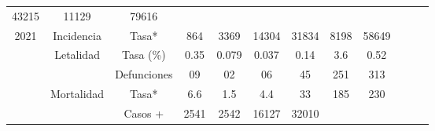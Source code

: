 \begin{tabular}{ccc|cccccc|lll}
		\multicolumn{1}{c|}{\cellcolor[HTML]{FFFC9E}43215} &
		\multicolumn{1}{c|}{\cellcolor[HTML]{FFFC9E}11129} &
		\cellcolor[HTML]{FFFC9E}79616 &
		&
		&
		\\ \cline{2-9}
		\multicolumn{1}{|c|}{\multirow{-5}{*}{\cellcolor[HTML]{FFFC9E}2021}} &
		\multicolumn{1}{c|}{\cellcolor[HTML]{FFFC9E}Incidencia} &
		\cellcolor[HTML]{FFFC9E}Tasa* &
		\multicolumn{1}{c|}{\cellcolor[HTML]{FFFC9E}864} &
		\multicolumn{1}{c|}{\cellcolor[HTML]{FFFC9E}3369} &
		\multicolumn{1}{c|}{\cellcolor[HTML]{FFFC9E}14304} &
		\multicolumn{1}{c|}{\cellcolor[HTML]{FFFC9E}31834} &
		\multicolumn{1}{c|}{\cellcolor[HTML]{FFFC9E}8198} &
		\cellcolor[HTML]{FFFC9E}58649 &
		&
		&
		\\ \cline{1-9}
		\multicolumn{1}{|c|}{\cellcolor[HTML]{C1EFC0}} &
		\multicolumn{1}{c|}{\cellcolor[HTML]{C1EFC0}Letalidad} &
		\cellcolor[HTML]{C1EFC0}Tasa (\%) &
		\multicolumn{1}{c|}{\cellcolor[HTML]{C1EFC0}0.35} &
		\multicolumn{1}{c|}{\cellcolor[HTML]{C1EFC0}0.079} &
		\multicolumn{1}{c|}{\cellcolor[HTML]{C1EFC0}0.037} &
		\multicolumn{1}{c|}{\cellcolor[HTML]{C1EFC0}0.14} &
		\multicolumn{1}{c|}{\cellcolor[HTML]{C1EFC0}3.6} &
		\cellcolor[HTML]{C1EFC0}0.52 &
		&
		&
		\\ \cline{3-9}
		\multicolumn{1}{|c|}{\cellcolor[HTML]{C1EFC0}} &
		\multicolumn{1}{c|}{\cellcolor[HTML]{C1EFC0}} &
		\cellcolor[HTML]{C1EFC0}Defunciones &
		\multicolumn{1}{c|}{\cellcolor[HTML]{C1EFC0}09} &
		\multicolumn{1}{c|}{\cellcolor[HTML]{C1EFC0}02} &
		\multicolumn{1}{c|}{\cellcolor[HTML]{C1EFC0}06} &
		\multicolumn{1}{c|}{\cellcolor[HTML]{C1EFC0}45} &
		\multicolumn{1}{c|}{\cellcolor[HTML]{C1EFC0}251} &
		\cellcolor[HTML]{C1EFC0}313 &
		&
		&
		\\ \cline{3-9}
		\multicolumn{1}{|c|}{\cellcolor[HTML]{C1EFC0}} &
		\multicolumn{1}{c|}{\cellcolor[HTML]{C1EFC0}Mortalidad} &
		\cellcolor[HTML]{C1EFC0}Tasa* &
		\multicolumn{1}{c|}{\cellcolor[HTML]{C1EFC0}6.6} &
		\multicolumn{1}{c|}{\cellcolor[HTML]{C1EFC0}1.5} &
		\multicolumn{1}{c|}{\cellcolor[HTML]{C1EFC0}4.4} &
		\multicolumn{1}{c|}{\cellcolor[HTML]{C1EFC0}33} &
		\multicolumn{1}{c|}{\cellcolor[HTML]{C1EFC0}185} &
		\cellcolor[HTML]{C1EFC0}230 &
		&
		&
		\\ \cline{3-9}
		\multicolumn{1}{|c|}{\cellcolor[HTML]{C1EFC0}} &
		\multicolumn{1}{c|}{\cellcolor[HTML]{C1EFC0}} &
		\cellcolor[HTML]{C1EFC0}Casos + &
		\multicolumn{1}{c|}{\cellcolor[HTML]{C1EFC0}2541} &
		\multicolumn{1}{c|}{\cellcolor[HTML]{C1EFC0}2542} &
		\multicolumn{1}{c|}{\cellcolor[HTML]{C1EFC0}16127} &
		\multicolumn{1}{c|}{\cellcolor[HTML]{C1EFC0}32010} &

\end{tabular}
